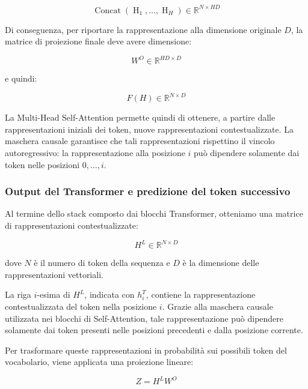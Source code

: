 \begin{equation}
\operatorname{Concat}
\left(
\operatorname{H}_1,\ldots,\operatorname{H}_H
\right)
\in\mathbb{R}^{N\times HD}
\end{equation}

Di conseguenza, per riportare la rappresentazione alla dimensione originale $D$, la matrice di proiezione finale deve avere dimensione:

\begin{equation}
W^O\in\mathbb{R}^{HD\times D}
\end{equation}

e quindi:

\begin{equation}
F(H)\in\mathbb{R}^{N\times D}
\end{equation}

La Multi-Head Self-Attention permette quindi di ottenere, a partire dalle rappresentazioni iniziali dei token, nuove rappresentazioni contestualizzate. La maschera causale garantisce che tali rappresentazioni rispettino il vincolo autoregressivo: la rappresentazione alla posizione $i$ può dipendere solamente dai token nelle posizioni $0,\ldots,i$.


\subsubsection{Output del Transformer e predizione del token successivo}

Al termine dello stack composto dai blocchi Transformer, otteniamo una matrice di rappresentazioni contestualizzate:

\begin{equation}
H^L \in \mathbb{R}^{N\times D}
\end{equation}

dove $N$ è il numero di token della sequenza e $D$ è la dimensione delle rappresentazioni vettoriali.

La riga $i$-esima di $H^L$, indicata con $h_i^T$, contiene la rappresentazione contestualizzata del token nella posizione $i$. Grazie alla maschera causale utilizzata nei blocchi di Self-Attention, tale rappresentazione può dipendere solamente dai token presenti nelle posizioni precedenti e dalla posizione corrente.

Per trasformare queste rappresentazioni in probabilità sui possibili token del vocabolario, viene applicata una proiezione lineare:

\begin{equation}
Z = H^L W^O
\end{equation}

